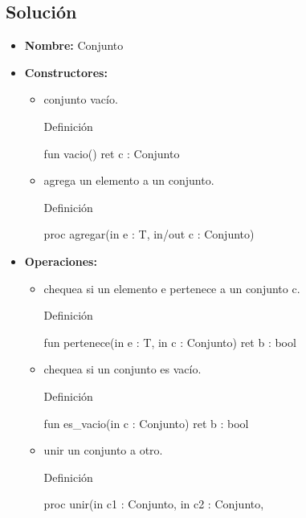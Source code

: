 \subsection{Solución}
\begin{itemize}
    \item \textbf{Nombre:} Conjunto
    \item \textbf{Constructores:}
    \begin{itemize}
        \item conjunto vacío.
        \begin{codebox}{Definición}
            \begin{pascallike}
                fun vacio() ret c : Conjunto
            \end{pascallike}
        \end{codebox}
        \item agrega un elemento a un conjunto.
        \begin{codebox}{Definición}
            \begin{pascallike}
                proc agregar(in e : T, in/out c : Conjunto)
            \end{pascallike}
        \end{codebox}
    \end{itemize}
    \item \textbf{Operaciones:}
    \begin{itemize}
        \item chequea si un elemento e pertenece a un conjunto c.
        \begin{codebox}{Definición}
            \begin{pascallike}
                fun pertenece(in e : T, in c : Conjunto) ret b : bool
            \end{pascallike}
        \end{codebox}
        \item chequea si un conjunto es vacío.
        \begin{codebox}{Definición}
            \begin{pascallike}
                fun es_vacio(in c : Conjunto) ret b : bool
            \end{pascallike}
        \end{codebox}
        \item unir un conjunto a otro.
        \begin{codebox}{Definición}
            \begin{pascallike}
                proc unir(in c1 : Conjunto, in c2 : Conjunto, 

\end{pascallike}
\end{codebox}
\end{itemize}
\end{itemize}
